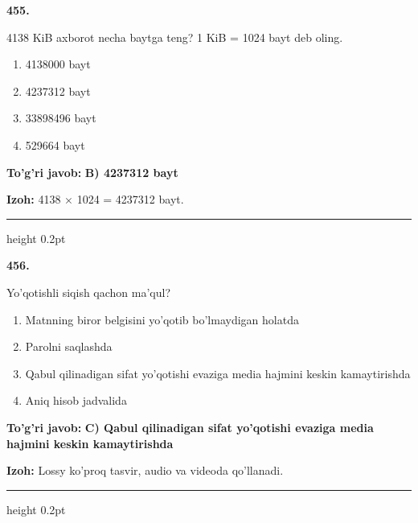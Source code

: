 \documentclass[10pt,a4paper,oneside]{article}
\begin{document}
\noindent\textbf{\color{ink}455.}
\par
4138 KiB axborot necha baytga teng? 1 KiB = 1024 bayt deb oling.
\begin{enumerate}[label=\Alph*),leftmargin=9mm]
\item 4138000 bayt
\item 4237312 bayt
\item 33898496 bayt
\item 529664 bayt
\end{enumerate}
\begin{tcolorbox}[enhanced,breakable,colback=teal!4,colframe=teal!50!black,boxrule=0.5pt,arc=1.1mm,left=3mm,right=3mm,top=1.7mm,bottom=1.7mm,before skip=2mm,after skip=2mm]
\textbf{\color{teal}To'g'ri javob:} \textbf{B) 4237312 bayt}
\par\smallskip
\textbf{Izoh:} 4138 \ensuremath{\times} 1024 = 4237312 bayt.
\end{tcolorbox}
\vspace{2mm}\hrule height 0.2pt \vspace{3mm}

\noindent\textbf{\color{ink}456.}
\par
Yo'qotishli siqish qachon ma'qul?
\begin{enumerate}[label=\Alph*),leftmargin=9mm]
\item Matnning biror belgisini yo'qotib bo'lmaydigan holatda
\item Parolni saqlashda
\item Qabul qilinadigan sifat yo'qotishi evaziga media hajmini keskin kamaytirishda
\item Aniq hisob jadvalida
\end{enumerate}
\begin{tcolorbox}[enhanced,breakable,colback=teal!4,colframe=teal!50!black,boxrule=0.5pt,arc=1.1mm,left=3mm,right=3mm,top=1.7mm,bottom=1.7mm,before skip=2mm,after skip=2mm]
\textbf{\color{teal}To'g'ri javob:} \textbf{C) Qabul qilinadigan sifat yo'qotishi evaziga media hajmini keskin kamaytirishda}
\par\smallskip
\textbf{Izoh:} Lossy ko'proq tasvir, audio va videoda qo'llanadi.
\end{tcolorbox}
\vspace{2mm}\hrule height 0.2pt \vspace{3mm}
\end{document}
